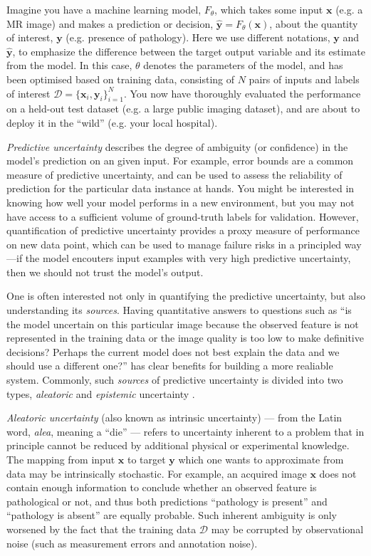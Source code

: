 Imagine you have a machine learning model, $F_{\theta}$, which takes some input $\mathbf{x}$  (e.g. a MR image) and makes a prediction or decision, $\hat{\mathbf{y}}=F_{\theta}(\mathbf{x})$, about the quantity of interest, $\mathbf{y}$ (e.g. presence of pathology). Here we use different notations, $\mathbf{y}$ and $\hat{\mathbf{y}}$, to emphasize the difference between the target output variable and its estimate from the model. In this case, $\theta$ denotes the parameters of the model, and has been optimised based on training data, consisting of $N$ pairs of inputs and labels of interest $\mathcal{D} = \{\mathbf{x}_{i}, \mathbf{y}_i\}_{i=1}^N $. You now have thoroughly evaluated the performance on a held-out test dataset (e.g. a large public imaging dataset), and are about to deploy it in the ``wild'' (e.g. your local hospital).

\textit{Predictive uncertainty} describes the degree of ambiguity (or confidence) in the model's prediction on an given input. For example, error bounds are a common measure of predictive uncertainty, and can be used to assess the reliability of prediction for the particular data instance at hands. You might be interested in knowing how well your model performs in a new environment, but you may not have access to a sufficient volume of ground-truth labels for validation. However, quantification of predictive uncertainty provides a proxy measure of performance on new data point, which can be used to manage failure risks in a principled way---if the model encouters input examples with very high predictive uncertainty, then we should not trust the model's output. 

One is often interested not only in quantifying the predictive uncertainty, but also understanding its \textit{sources}. Having quantitative answers to questions such as ``is the model uncertain on this particular image because the observed feature is not represented in the training data or the image quality is too low to make definitive decisions? Perhaps the current model does not best explain the data and we should use a different one?'' has clear benefits for building a more realiable system. Commonly, such \textit{sources} of predictive uncertainty is divided into two types, \textit{aleatoric} and \textit{epistemic} uncertainty \cite{hora1996aleatory,der2009aleatory}. 

\textit{Aleatoric uncertainty} (also known as intrinsic uncertainty) --- from the Latin word, \textit{alea}, meaning a ``die'' --- refers to uncertainty inherent to a problem that in principle cannot be reduced by additional physical or experimental knowledge. The mapping from input $\textbf{x}$ to target $\mathbf{y}$ which one wants to approximate from data may be intrinsically stochastic. For example, an acquired image $\textbf{x}$ does not contain enough information to conclude whether an observed feature is pathological or not, and thus both predictions ``pathology is present'' and ``pathology is absent'' are equally probable. Such inherent ambiguity is only worsened by the fact that the training data $\mathcal{D}$ may be corrupted by observational noise (such as measurement errors and annotation noise).  

